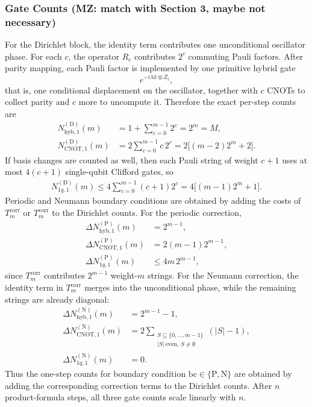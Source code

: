 \documentclass{article}
\newcommand{\cb}[1]{{\color{blue}#1}}
\begin{document}
\subsubsection{Gate Counts \cb{(MZ: match with Section 3, maybe not necessary)}}

For the Dirichlet block, the identity term contributes one unconditional oscillator phase. For each $c$, the operator $R_c$ contributes $2^c$ commuting Pauli factors. After parity mapping, each Pauli factor is implemented by one primitive hybrid gate
\[
e^{-i\lambda \hat x\otimes Z_t},
\]
that is, one conditional displacement on the oscillator, together with $c$ CNOTs to collect parity and $c$ more to uncompute it. Therefore the exact per-step counts are
\begin{align}
    N_{\mathrm{hyb},1}^{(\mathrm D)}(m)
    &=
    1+\sum_{c=0}^{m-1}2^c
    = 2^m = M, \\
    N_{\mathrm{CNOT},1}^{(\mathrm D)}(m)
    &=
    2\sum_{c=0}^{m-1} c\,2^c
    =
    2\bigl[(m-2)2^m + 2\bigr].
\end{align}
If basis changes are counted as well, then each Pauli string of weight $c+1$ uses at most $4(c+1)$ single-qubit Clifford gates, so
\begin{align}
    N_{1q,1}^{(\mathrm D)}(m)
    \le
    4\sum_{c=0}^{m-1}(c+1)2^c
    =
    4\bigl[(m-1)2^m + 1\bigr].
\end{align}
Periodic and Neumann boundary conditions are obtained by adding the costs of $T_m^{\mathrm{corr}}$ or $T_m^{\mathrm{corr}}$ to the Dirichlet counts. For the periodic correction,
\begin{align}
    \Delta N_{\mathrm{hyb},1}^{(\mathrm P)}(m)
    &= 2^{m-1}, \\
    \Delta N_{\mathrm{CNOT},1}^{(\mathrm P)}(m)
    &= 2(m-1)2^{m-1}, \\
    \Delta N_{1q,1}^{(\mathrm P)}(m)
    &\le 4m\,2^{m-1},
\end{align}
since $T_m^{\mathrm{corr}}$ contributes $2^{m-1}$ weight-$m$ strings. For the Neumann correction, the identity term in $T_m^{\mathrm{corr}}$ merges into the unconditional phase, while the remaining strings are already diagonal:
\begin{align}
    \Delta N_{\mathrm{hyb},1}^{(\mathrm N)}(m)
    &= 2^{m-1}-1, \\
    \Delta N_{\mathrm{CNOT},1}^{(\mathrm N)}(m)
    &= 2\sum_{\substack{S\subseteq\{0,\dots,m-1\}\\ |S|\ \mathrm{even},\,S\neq\emptyset}}
    (|S|-1), \\
    \Delta N_{1q,1}^{(\mathrm N)}(m)
    &= 0.
\end{align}
Thus the one-step counts for boundary condition $\mathrm{bc}\in\{\mathrm P,\mathrm N\}$ are obtained by adding the corresponding correction terms to the Dirichlet counts. After $n$ product-formula steps, all three gate counts scale linearly with $n$.
\end{document}
